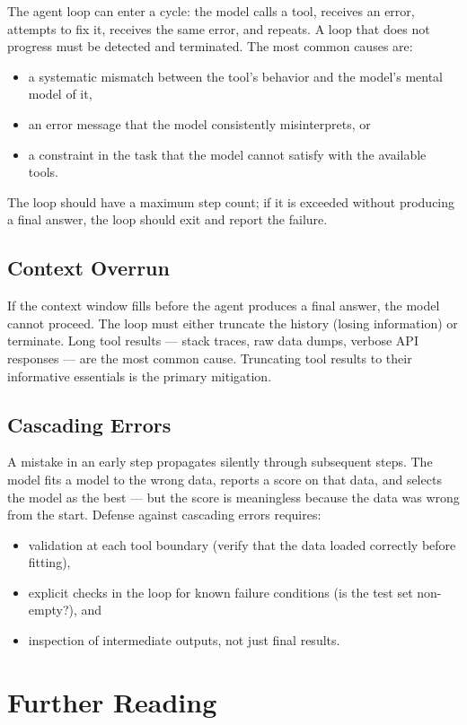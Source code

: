 The agent loop can enter a cycle: the model calls a tool, receives an error, attempts to fix it, receives the same error, and repeats.
A loop that does not progress must be detected and terminated.
The most common causes are:
\begin{itemize}
\item a systematic mismatch between the tool's behavior and the model's mental model of it,
\item an error message that the model consistently misinterprets, or
\item a constraint in the task that the model cannot satisfy with the available tools.
\end{itemize}
The loop should have a maximum step count; if it is exceeded without producing a final answer, the loop should exit and report the failure.

\subsection{Context Overrun}

If the context window fills before the agent produces a final answer, the model cannot proceed.
The loop must either truncate the history (losing information) or terminate.
Long tool results — stack traces, raw data dumps, verbose API responses — are the most common cause.
Truncating tool results to their informative essentials is the primary mitigation.

\subsection{Cascading Errors}

A mistake in an early step propagates silently through subsequent steps.
The model fits a model to the wrong data, reports a score on that data, and selects the model as the best — but the score is meaningless because the data was wrong from the start.
Defense against cascading errors requires:
\begin{itemize}
\item validation at each tool boundary (verify that the data loaded correctly before fitting),
\item explicit checks in the loop for known failure conditions (is the test set non-empty?), and
\item inspection of intermediate outputs, not just final results.
\end{itemize}

\section*{Further Reading}

